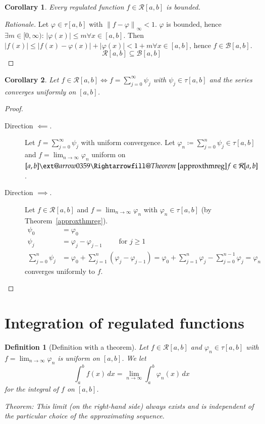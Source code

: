 \documentclass{article}
\makeatletter
\newtheorem{definition}{Definition}  \numberwithin{definition}{section}
\newtheorem*{corollary}{Corollary}%
\newcommand{\norm}[1]{\left\|#1\right\|}
\newcommand{\card}[1]{\left|#1\right|}
\newcommand{\xRightarrow}[2][]{\ext@arrow 0359\Rightarrowfill@{#1}{#2}}
\makeatother
\begin{document}
\begin{corollary}
  Every regulated function $f \in \mathcal R[a,b]$ is bounded.
\end{corollary}

\begin{proof}[Rationale]
  Let $\varphi \in \tau[a,b]$ with $\norm{f - \varphi}_{\infty} < 1$.
  $\varphi$ is bounded, hence $\exists m \in [0, \infty)$:
  $\card{\varphi(x)} \leq m \forall x \in [a,b]$.
  Then $\card{f(x)} \leq \card{f(x) - \varphi(x)} + \card{\varphi(x)} < 1 + m \forall x \in [a,b]$,
  hence $f \in \mathcal B[a,b]$.
  \[ \mathcal R[a,b] \subseteq \mathcal B[a,b] \]
\end{proof}

\begin{corollary}
  Let $f \in \mathcal R[a,b] \iff f = \sum_{j=0}^\infty \psi_j$ with $\psi_j \in \tau[a,b]$ and the series converges uniformly on $[a,b]$.
\end{corollary}

\begin{proof}\hfill{}
  \begin{description}
    \item[Direction $\impliedby$.]
      Let $f = \sum_{j=0}^\infty \psi_j$ with uniform convergence.
      Let $\varphi_n \coloneqq \sum_{j=0}^n \psi_j \in \tau[a,b]$ and $f = \lim_{n\to\infty} \varphi_n$ uniform on $[a,b] \xRightarrow{Theorem~\ref{approxthmreg}} f \in \mathcal R[a,b]$.
    \item[Direction $\implies$.]
      Let $f \in \mathcal R[a,b]$ and $f = \lim_{n\to\infty} \varphi_n$ with $\varphi_n \in \tau[a,b]$ (by Theorem~\ref{approxthmreg}).
      \begin{align*}
        \psi_0 &= \varphi_0 \\
        \psi_j &= \varphi_j - \varphi_{j-1} \qquad \text{ for } j \geq 1 \\
        \sum_{j=0}^n \psi_j &= \varphi_0 + \sum_{j=1}^n (\varphi_j - \varphi_{j-1}) = \varphi_0 + \sum_{j=1}^n \varphi_j - \sum_{j=0}^{n-1} \varphi_j = \varphi_n
      \end{align*}
      converges uniformly to $f$.
  \end{description}
\end{proof}

\section{Integration of regulated functions}

\begin{definition}[Definition with a theorem] %
  Let $f \in \mathcal R[a,b]$ and $\varphi_n \in \tau[a,b]$ with $f = \lim_{n\to\infty} \varphi_n$ is uniform on $[a,b]$.
  We let
  \[ \int_a^b f(x) \, dx = \lim_{n\to\infty} \int_a^b \varphi_n(x) \, dx \]
  for the integral of $f$ on $[a,b]$.

  Theorem: This limit (on the right-hand side) always exists and is independent of the particular choice of the approximating sequence.
\end{definition}
\end{document}
